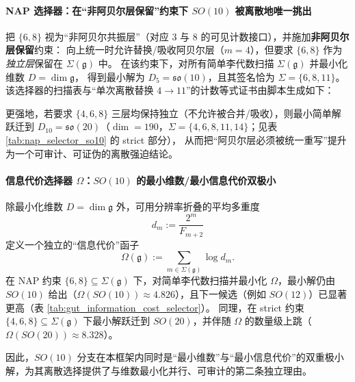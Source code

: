 \paragraph{NAP 选择器：在“非阿贝尔层保留”约束下 \texorpdfstring{$SO(10)$}{SO(10)} 被离散地唯一挑出}
把 \(\{6,8\}\) 视为“非阿贝尔共振层”（对应 \(3\) 与 \(8\) 的可见计数接口），并施加\textbf{非阿贝尔层保留}约束：
向上统一时允许替换/吸收阿贝尔层（\(m=4\)），但要求 \(\{6,8\}\) 作为\emph{独立层}保留在 \(\Sigma(\mathfrak g)\) 中。
在该约束下，对所有简单李代数扫描 \(\Sigma(\mathfrak g)\) 并最小化维数 \(D=\dim\mathfrak g\)，
得到最小解为 \(D_5=\mathfrak{so}(10)\)，且其签名恰为 \(\Sigma=\{6,8,11\}\)。
该选择器的扫描表与“单次离散替换 \(4\to 11\)”的计数等式证书由脚本生成如下：


\par
更强地，若要求 \(\{4,6,8\}\) 三层均保持独立（不允许被合并/吸收），则最小简单解跃迁到 \(D_{10}=\mathfrak{so}(20)\)（\(\dim=190\)，\(\Sigma=\{4,6,8,11,14\}\)；见表 \ref{tab:nap_selector_so10} 的 strict 部分），
从而把“阿贝尔层必须被统一重写”提升为一个可审计、可证伪的离散强迫结论。

\paragraph{信息代价选择器 \texorpdfstring{$\Omega$}{Omega}：\texorpdfstring{$SO(10)$}{SO(10)} 的最小维数/最小信息代价双极小}
除最小化维数 \(D=\dim\mathfrak g\) 外，可用分辨率折叠的平均多重度
\[
d_m:=\frac{2^m}{F_{m+2}}
\]
定义一个独立的“信息代价”函子
\[
\Omega(\mathfrak g):=\sum_{m\in\Sigma(\mathfrak g)}\log d_m.
\]
在 NAP 约束 \(\{6,8\}\subseteq\Sigma(\mathfrak g)\) 下，对简单李代数扫描并最小化 \(\Omega\)，最小解仍由 \(SO(10)\) 给出（\(\Omega(SO(10))\approx 4.826\)），且下一候选（例如 \(SO(12)\)）已显著更高（表 \ref{tab:gut_information_cost_selector}）。
同理，在 strict 约束 \(\{4,6,8\}\subseteq\Sigma(\mathfrak g)\) 下最小解跃迁到 \(SO(20)\)，并伴随 \(\Omega\) 的数量级上跳（\(\Omega(SO(20))\approx 8.328\)）。

因此，\(SO(10)\) 分支在本框架内同时是“最小维数”与“最小信息代价”的双重极小解，为其离散选择提供了与维数最小化并行、可审计的第二条独立理由。

